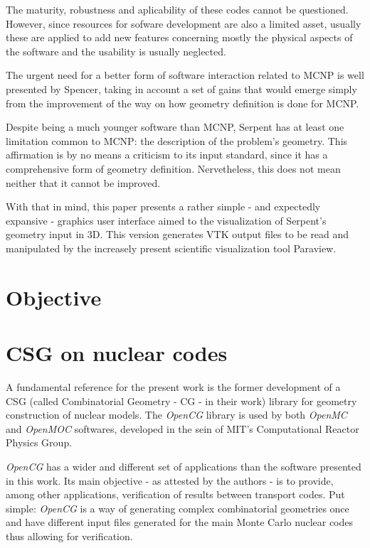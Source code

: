 \documentclass{elsarticle}
\begin{document}
The maturity, robustness and aplicability of these codes cannot be questioned.
However, since resources for sofware development are also a limited asset,
usually these are applied to add new features concerning mostly the physical aspects of the software and the usability is usually neglected.

The urgent need for a better form of software interaction related to MCNP
is well presented by Spencer\cite{Spencer2017}, taking in account a set of gains that would emerge simply from the improvement of the way on how geometry definition is done for MCNP.

Despite being a much younger software than MCNP, Serpent has at least one limitation common to MCNP: the description of the problem's geometry. This affirmation is by no means a criticism to its input standard, since it has a comprehensive form of geometry
definition. Nervetheless, this does not mean neither that it cannot be improved.

With that in mind, this paper presents a rather simple - and expectedly expansive -
graphics user interface aimed to the visualization of Serpent's geometry input
in 3D. This version generates VTK output files to be read and manipulated by
the increasely present scientific visualization tool Paraview\cite{paraview}.

\section{Objective}


\section{CSG on nuclear codes}

A fundamental reference for the present work is the former development of a CSG
(called Combinatorial Geometry - CG - in their work) library for geometry construction
of nuclear models. The \textit{OpenCG} library \cite{Boyd2015} is used by both
\textit{OpenMC} \cite{openMC} and \textit{OpenMOC} softwares, developed in the sein
of MIT's Computational Reactor Physics Group.

\textit{OpenCG} has a wider and different set of applications than the
software presented in this work. Its main objective - as attested by the authors -
is to provide, among other applications, verification of results between transport
codes. Put simple: \textit{OpenCG} is a way of generating complex
combinatorial geometries once and have different input files generated for the main
Monte Carlo nuclear codes thus allowing for verification.
\end{document}
